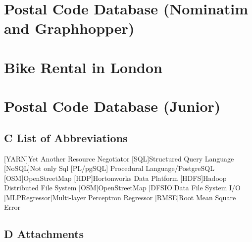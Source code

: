 \documentclass[12pt]{report}
\renewcommand{\listfigurename}{\begingroup
    \tocchapter{}
    \tocfile{\listoffigurename}{B Illustration Directory}
\endgroup}
\begin{document}
\chapter{Postal Code Database (Nominatim and Graphhopper)}





\chapter{Bike Rental in London}




\chapter{Postal Code Database (Junior)}



\newpage


\renewcommand{\listfigurename}{B Illustration Directory}
\listoffigures
\section*{C List of Abbreviations}
\begin{acronym}
    [YARN]{Yet Another Resource Negotiator}
     [SQL]{Structured Query Language}
     [NoSQL]{Not only Sql}
    [PL/pgSQL] {Procedural Language/PostgreSQL}
    [OSM]{OpenStreetMap}
    [HDP]{Hortonworks Data Platform}
     [HDFS]{Hadoop Distributed File System}
    [OSM]{OpenStreetMap}
    [DFSIO]{Data File System I/O}
    [MLPRegressor]{Multi-layer Perceptron Regressor}
    [RMSE]{Root Mean Square Error}
\end{acronym}
\newpage
\section*{D Attachments}
\end{document}
